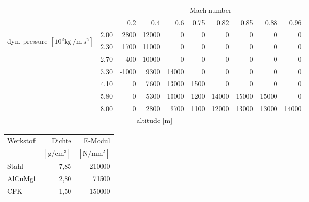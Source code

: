 \begin{table}[htb]
	\centering
	\label{tab:refCase}
	\begin{tabularx}{\textwidth-4em}{m{6mm}Xrrrrrrrr}
		\toprule
		&		& \multicolumn{8}{c}{Mach number}\\
		\cmidrule{3-10}
		& 		& 0.2	& 0.4	& 0.6	& 0.75	& 0.82	& 0.85	& 0.88& 0.96\\
		\midrule %
		\multirow{7}{*}{\begin{sideways} dyn. pressure $\mathrm{[10^3 kg\:/m\:s^2]}$ \end{sideways}}%
		& 2.00 	& 2800	& 12000	& 0		& 0		& 0		& 0		& 0		& 0	\\
		& 2.30 	& 1700	& 11000	& 0		& 0		& 0		& 0		& 0		& 0	\\
		& 2.70 	& 400	& 10000	& 0		& 0		& 0		& 0		& 0		& 0	\\
		& 3.30 	&-1000	& 9300	& 14000	& 0		& 0		& 0		& 0		& 0	\\
		& 4.10 	& 0		& 7600	& 13000	& 1500	& 0		& 0		& 0		& 0	\\
		& 5.80 	& 0		& 5300	& 10000	& 1200	& 14000	& 15000	& 15000 & 0	\\
		& 8.00 	& 0		& 2800	& 8700	& 1100	& 12000	& 13000	& 13000 & 14000\\
		\midrule
		\multicolumn{10}{c}{altitude [$\mathrm{m}$]}\\
		\bottomrule
	\end{tabularx}
\end{table}

\begin{table}[htb]
	\centering
	\begin{tabular}{lrr}
		\toprule
		Werkstoff	& Dichte				& E-Modul\\
		& $\mathrm{[g/cm^3]}$	& $\mathrm{[N/mm^2]}$\\
		\midrule
		Stahl		& 7,85					& 210000\\
		AlCuMg1 	& 2,80					& 71500\\
		CFK			& 1,50					& 150000\\
		\bottomrule
	\end{tabular}
	\label{tab:refCase_simple}
\end{table}

